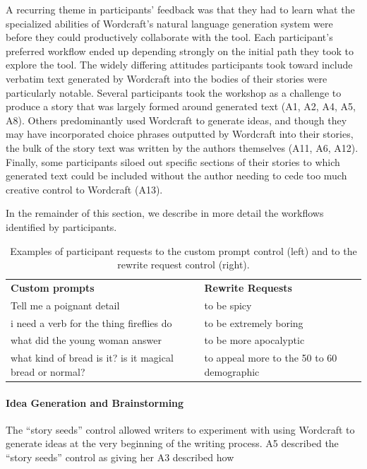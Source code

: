 A recurring theme in participants' feedback was that they had to learn what the specialized abilities of Wordcraft's natural language generation system were before they could productively collaborate with the tool. 
Each participant's preferred workflow ended up depending strongly on the initial path they took to explore the tool.
The widely differing attitudes participants took toward include verbatim text generated by Wordcraft into the bodies of their stories were particularly notable.
Several participants took the workshop as a challenge to produce a story that was largely formed around generated text (A1, A2, A4, A5, A8).
Others predominantly used Wordcraft to generate ideas, and though they may have incorporated choice phrases outputted by Wordcraft into their stories, the bulk of the story text was written by the authors themselves (A11, A6, A12).
Finally, some participants siloed out specific sections of their stories to which generated text could be included without the author needing to cede too much creative control to Wordcraft (A13).

In the remainder of this section, we describe in more detail the workflows identified by participants.

\begin{table}[t]
  \centering
  \small
  \caption{Examples of participant requests to the custom prompt control (left) and to the rewrite request control (right).}
  \label{table:control_uses}
    \begin{tabular}{p{2.7in}|p{3in}}
    \hline
    \textbf{Custom prompts} & \textbf{Rewrite Requests} \\
    Tell me a poignant detail & to be spicy \\
    i need a verb for the thing fireflies do  & to be extremely boring \\
    what did the young woman answer  & to be more apocalyptic \\
    what kind of bread is it? is it magical bread or normal?  & to appeal more to the 50 to 60 demographic \\
    \hline
    \end{tabular}%
\end{table}%


\paragraph{Idea Generation and Brainstorming}
The ``story seeds'' control allowed writers to experiment with using Wordcraft to generate ideas at the very beginning of the writing process.
A5 described the ``story seeds'' control as giving her 
A3 described how 

